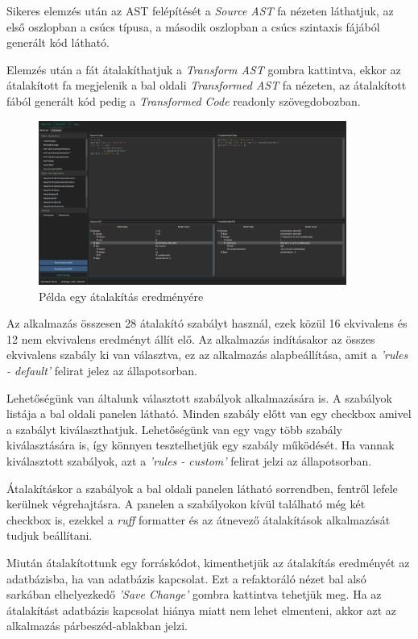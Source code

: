 Sikeres elemzés után az AST felépítését a \emph{Source AST} fa nézeten láthatjuk, 
az első oszlopban a csúcs típusa, a második oszlopban a csúcs szintaxis fájából %
generált kód látható. 

Elemzés után a fát átalakíthatjuk a \emph{Transform AST} gombra kattintva, 
ekkor az átalakított fa megjelenik a bal oldali \emph{Transformed AST} fa nézeten,
az átalakított fából generált kód pedig a \emph{Transformed Code} readonly szövegdobozban.

\begin{figure}[H]
	\centering
	\includegraphics[width=0.9\textwidth]{images/screenshots/refactor_tab_2.png}
	\caption{Példa egy átalakítás eredményére}
\end{figure}

Az alkalmazás összesen 28 átalakító szabályt használ, ezek közül 16 ekvivalens és 12 nem ekvivalens
eredményt állít elő.
Az alkalmazás indításakor az összes ekvivalens szabály ki van választva,
ez az alkalmazás alapbeállítása, amit a \emph{'rules - default'} felirat jelez az állapotsorban.

Lehetőségünk van általunk választott szabályok alkalmazására is.
A szabályok listája a bal oldali panelen látható. Minden szabály előtt van egy checkbox
amivel a szabályt kiválaszthatjuk. Lehetőségünk van egy vagy több szabály kiválasztására is,
így könnyen tesztelhetjük egy szabály működését.
Ha vannak kiválasztott szabályok, azt a \emph{'rules - custom'} felirat jelzi az állapotsorban.

Átalakításkor a szabályok a bal oldali panelen látható sorrendben, fentről lefele kerülnek végrehajtásra.
A panelen a szabályokon kívül található még két checkbox is,
ezekkel a \emph{ruff} formatter és az átnevező átalakítások alkalmazását tudjuk beállítani.

Miután átalakítottunk egy forráskódot, kimenthetjük az átalakítás eredményét az adatbázisba,
ha van adatbázis kapcsolat.
Ezt a refaktoráló nézet bal alsó sarkában elhelyezkedő \emph{'Save Change'} gombra kattintva
tehetjük meg.
Ha az átalakítást adatbázis kapcsolat hiánya miatt nem lehet elmenteni,
akkor azt az alkalmazás párbeszéd-ablakban jelzi.

